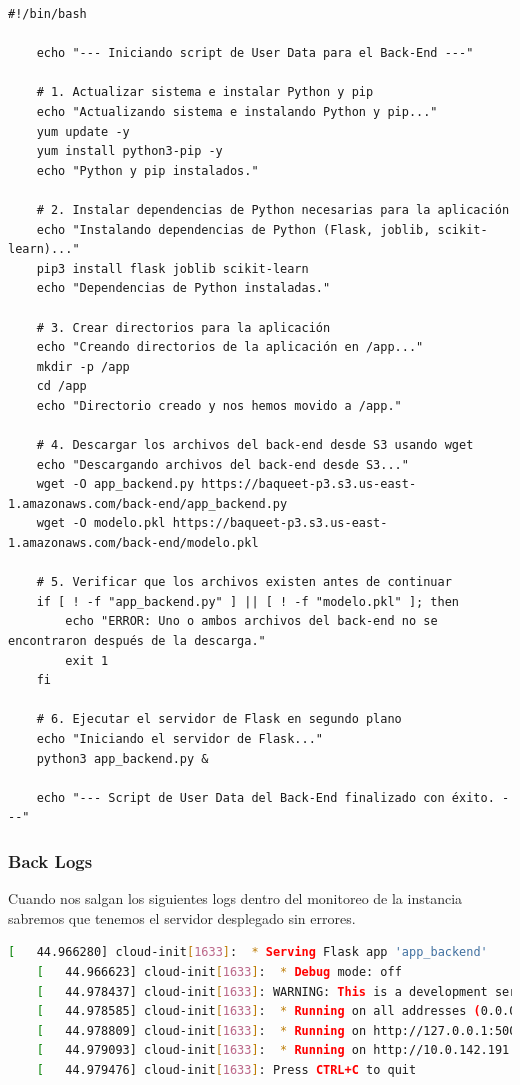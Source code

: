 \documentclass{article}
\begin{document}
	\begin{lstlisting}[style=python-style, caption= back user data sh]
	#!/bin/bash

	echo "--- Iniciando script de User Data para el Back-End ---"

	# 1. Actualizar sistema e instalar Python y pip
	echo "Actualizando sistema e instalando Python y pip..."
	yum update -y
	yum install python3-pip -y
	echo "Python y pip instalados."

	# 2. Instalar dependencias de Python necesarias para la aplicación
	echo "Instalando dependencias de Python (Flask, joblib, scikit-learn)..."
	pip3 install flask joblib scikit-learn
	echo "Dependencias de Python instaladas."

	# 3. Crear directorios para la aplicación
	echo "Creando directorios de la aplicación en /app..."
	mkdir -p /app
	cd /app
	echo "Directorio creado y nos hemos movido a /app."

	# 4. Descargar los archivos del back-end desde S3 usando wget
	echo "Descargando archivos del back-end desde S3..."
	wget -O app_backend.py https://baqueet-p3.s3.us-east-1.amazonaws.com/back-end/app_backend.py
	wget -O modelo.pkl https://baqueet-p3.s3.us-east-1.amazonaws.com/back-end/modelo.pkl

	# 5. Verificar que los archivos existen antes de continuar
	if [ ! -f "app_backend.py" ] || [ ! -f "modelo.pkl" ]; then
		echo "ERROR: Uno o ambos archivos del back-end no se encontraron después de la descarga."
		exit 1
	fi

	# 6. Ejecutar el servidor de Flask en segundo plano
	echo "Iniciando el servidor de Flask..."
	python3 app_backend.py &

	echo "--- Script de User Data del Back-End finalizado con éxito. ---"

	\end{lstlisting}

	\subsubsection{Back Logs}
	Cuando nos salgan los siguientes logs dentro del monitoreo de la instancia sabremos que tenemos el servidor desplegado sin errores.

	\begin{lstlisting}[style=consola, language=bash, caption={back logs}]
	[   44.966280] cloud-init[1633]:  * Serving Flask app 'app_backend'
	[   44.966623] cloud-init[1633]:  * Debug mode: off
	[   44.978437] cloud-init[1633]: WARNING: This is a development server. Do not use it in a production deployment. Use a production WSGI server instead.
	[   44.978585] cloud-init[1633]:  * Running on all addresses (0.0.0.0)
	[   44.978809] cloud-init[1633]:  * Running on http://127.0.0.1:5000
	[   44.979093] cloud-init[1633]:  * Running on http://10.0.142.191:5000
	[   44.979476] cloud-init[1633]: Press CTRL+C to quit\end{lstlisting}
\end{document}
